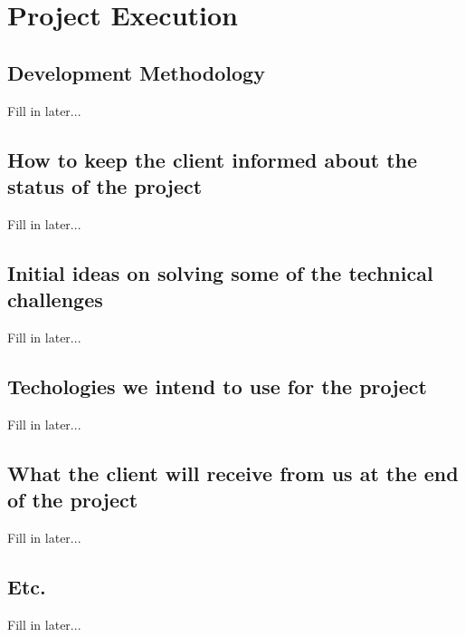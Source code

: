 \documentclass[12pt, oneside]{article}
\begin{document}
\section{Project Execution}
	\subsection{Development Methodology}
		Fill in later...
	\subsection{How to keep the client informed about the status of the project}
		Fill in later...
	\subsection{Initial ideas on solving some of the technical challenges}
		Fill in later...
	\subsection{Techologies we intend to use for the project}
		Fill in later...
	\subsection{What the client will receive from us at the end of the project}
		Fill in later...
	\subsection{Etc.}
		Fill in later...
\end{document}

